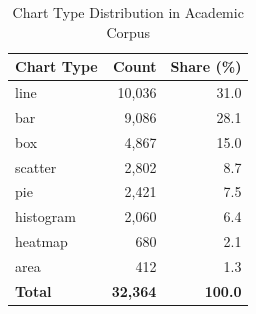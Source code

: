 \begin{table}[htbp]
\centering
\caption{Chart Type Distribution in Academic Corpus}
\label{tab:chart-type-dist}
\begin{tabular}{@{}lrr@{}}
\toprule
\textbf{Chart Type} & \textbf{Count} & \textbf{Share (\%)} \\
\midrule
line      & 10,036 & 31.0 \\
bar       &  9,086 & 28.1 \\
box       &  4,867 & 15.0 \\
scatter   &  2,802 &  8.7 \\
pie       &  2,421 &  7.5 \\
histogram &  2,060 &  6.4 \\
heatmap   &    680 &  2.1 \\
area      &    412 &  1.3 \\
\midrule
\textbf{Total} & \textbf{32,364} & \textbf{100.0} \\
\bottomrule
\end{tabular}
\end{table}